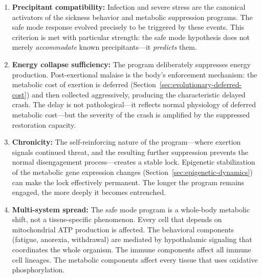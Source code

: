 \begin{enumerate}
    \item \textbf{Precipitant compatibility:} Infection and severe stress are the canonical activators of the sickness behavior and metabolic suppression programs. The safe mode response evolved precisely to be triggered by these events. This criterion is met with particular strength: the safe mode hypothesis does not merely \emph{accommodate} known precipitants---it \emph{predicts} them.

    \item \textbf{Energy collapse sufficiency:} The program deliberately suppresses energy production. Post-exertional malaise is the body's enforcement mechanism: the metabolic cost of exertion is deferred (Section~\ref{sec:evolutionary-deferred-cost}) and then collected aggressively, producing the characteristic delayed crash. The delay is not pathological---it reflects normal physiology of deferred metabolic cost---but the severity of the crash is amplified by the suppressed restoration capacity.

    \item \textbf{Chronicity:} The self-reinforcing nature of the program---where exertion signals continued threat, and the resulting further suppression prevents the normal disengagement process---creates a stable lock. Epigenetic stabilization of the metabolic gene expression changes (Section~\ref{sec:epigenetic-dynamics}) can make the lock effectively permanent. The longer the program remains engaged, the more deeply it becomes entrenched.

    \item \textbf{Multi-system spread:} The safe mode program is a whole-body metabolic shift, not a tissue-specific phenomenon. Every cell that depends on mitochondrial ATP production is affected. The behavioral components (fatigue, anorexia, withdrawal) are mediated by hypothalamic signaling that coordinates the whole organism. The immune components affect all immune cell lineages. The metabolic components affect every tissue that uses oxidative phosphorylation.
\end{enumerate}

